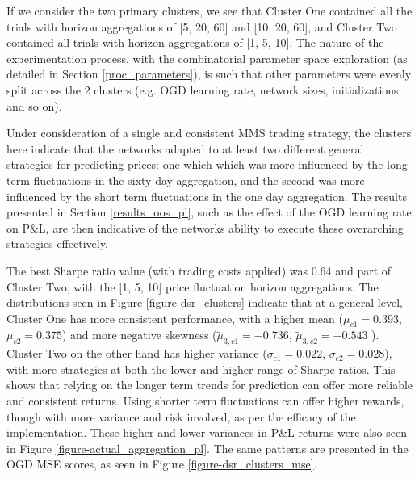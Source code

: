 \documentclass[a4paper,11pt,oneside]{article}
\theoremstyle{plain}
\theoremstyle{definition}
\begin{document}
	If we consider the two primary clusters, we see that Cluster One contained all the trials with horizon aggregations of [5, 20, 60] and [10, 20, 60], and Cluster Two contained all trials with horizon aggregations of [1, 5, 10]. The nature of the experimentation process, with the combinatorial parameter space exploration (as detailed in Section \ref{proc_parameters}), is such that other parameters were evenly split across the 2 clusters (e.g. OGD learning rate, network sizes, initializations and so on).\newline
	
	Under consideration of a single and consistent MMS trading strategy, the clusters here indicate that the networks adapted to at least two different general strategies for predicting prices: one which which was more influenced by the long term fluctuations in the sixty day aggregation, and the second was more influenced by the short term fluctuations in the one day aggregation. The results presented in Section \ref{results_oos_pl}, such as the effect of the OGD learning rate on P\&L, are then indicative of the networks ability to execute these overarching strategies effectively. \newline
	
	The best Sharpe ratio value (with trading costs applied) was 0.64 and part of Cluster Two, with the [1, 5, 10] price fluctuation horizon aggregations. The distributions seen in Figure \ref{figure-dsr_clusters} indicate that at a general level, Cluster One has more consistent performance, with a higher mean ($\mu_{c1} = 0.393$, $\mu_{c2} = 0.375$) and more negative skewness ($\tilde{\mu}_{3,c1} = -0.736$, $\tilde{\mu}_{3,c2} = -0.543$ ). Cluster Two on the other hand has higher variance ($\sigma_{c1} = 0.022$, $\sigma_{c2} = 0.028$), with more strategies at both the lower and higher range of Sharpe ratios. This shows that relying on the longer term trends for prediction can offer more reliable and consistent returns. Using shorter term fluctuations can offer higher rewards, though with more variance and risk involved, as per the efficacy of the implementation. These higher and lower variances in P\&L returns were also seen in Figure \ref{figure-actual_aggregation_pl}. The same patterns are presented in the OGD MSE scores, as seen in Figure \ref{figure-dsr_clusters_mse}.\newline
\end{document}
